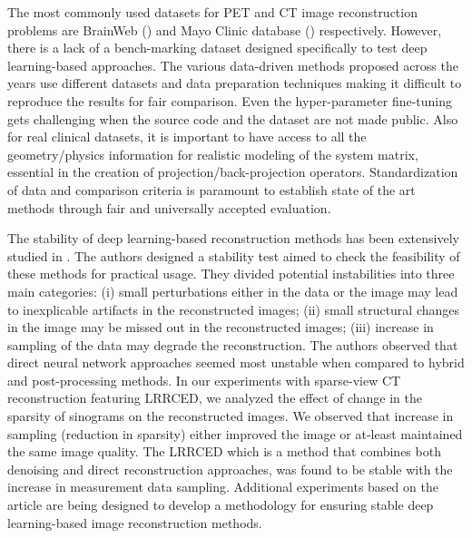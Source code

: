 The most commonly used datasets for \ac{PET} and \ac{CT} image reconstruction problems are BrainWeb (\cite{cocosco1997brainweb}) and Mayo Clinic database (\cite{moen2021low}) respectively. However, there is a lack of a bench-marking dataset designed specifically to test deep learning-based approaches. The various data-driven methods proposed across the years use different datasets and data preparation techniques making it difficult to reproduce the results for fair comparison. Even the hyper-parameter fine-tuning gets challenging when the source code and the dataset are not made public. Also for real clinical datasets, it is important to have access to all the geometry/physics information for realistic modeling of the system matrix, essential in the creation of projection/back-projection operators. Standardization of data and comparison criteria is paramount to establish state of the art methods through fair and universally accepted evaluation.

The stability of deep learning-based reconstruction methods has been extensively studied in \cite{antun2020instabilities}. The authors designed a stability test aimed to check the feasibility of these methods for practical usage. They divided potential instabilities into three main categories: (i) small perturbations either in the data or the image may lead to inexplicable artifacts in the reconstructed images; (ii) small structural changes in the image may be missed out in the reconstructed images; (iii) increase in sampling of the data may degrade the reconstruction. The authors observed that direct neural network approaches seemed most unstable when compared to hybrid and post-processing methods. In our experiments with sparse-view CT reconstruction featuring \ac{LRRCED}, we analyzed the effect of change in the sparsity of sinograms on the reconstructed images. We observed that increase in sampling (reduction in sparsity) either improved the image or at-least maintained the same image quality. The LRRCED which is a method that combines both denoising and direct reconstruction approaches, was found to be stable with the increase in measurement data sampling. Additional experiments based on the article are being designed to develop a methodology for ensuring stable deep learning-based image reconstruction methods. 

